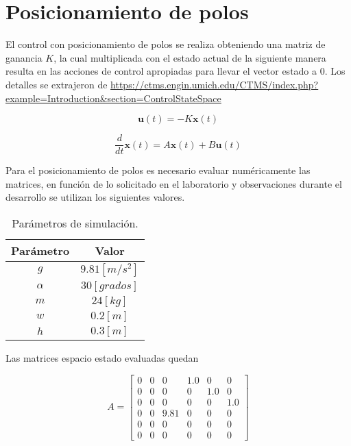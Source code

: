 \documentclass[titlepage, letterpaper]{article}
\begin{document}
\section{Posicionamiento de polos}

El control con posicionamiento de polos se realiza obteniendo una matriz de ganancia $K$, la cual multiplicada con el estado actual de la siguiente manera resulta en las acciones de control apropiadas para llevar el vector estado a 0. Los detalles se extrajeron de \url{https://ctms.engin.umich.edu/CTMS/index.php?example=Introduction&section=ControlStateSpace}

\[\pmb{u}(t) = -K\pmb{x}(t)\]

\begin{equation*}
	\frac{d}{d t} \pmb{x}{\left(t \right)}
	= A\pmb{x}(t) + B \pmb{u}(t)
\end{equation*}

Para el posicionamiento de polos es necesario evaluar numéricamente las matrices, en función de lo solicitado en el laboratorio y observaciones durante el desarrollo se utilizan los siguientes valores.

\begin{table}[H]
	\centering
	\begin{tabular}{|c|c|}
	\hline
	Parámetro & Valor          \\ \hline
	$g$       & $9.81 [m/s^2]$ \\ \hline
	$\alpha$  & $30 [grados]$  \\ \hline
	$m$       & $24 [kg]$      \\ \hline
	$w$       & $0.2 [m]$     \\ \hline
	$h$       & $0.3 [m]$     \\ \hline
	\end{tabular}
	\caption{Parámetros de simulación.}
\end{table}

Las matrices espacio estado evaluadas quedan

\begin{equation*}
	A = \left[\begin{matrix}0 & 0 & 0 & 1.0 & 0 & 0\\0 & 0 & 0 & 0 & 1.0 & 0\\0 & 0 & 0 & 0 & 0 & 1.0\\0 & 0 & 9.81 & 0 & 0 & 0\\0 & 0 & 0 & 0 & 0 & 0\\0 & 0 & 0 & 0 & 0 & 0\end{matrix}\right]
\end{equation*}
\end{document}
